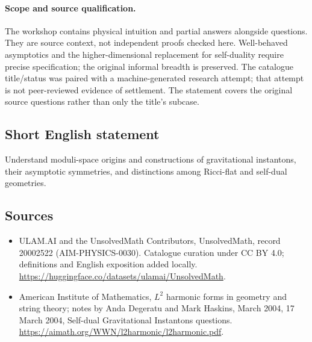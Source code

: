 \documentclass[11pt]{article}
\begin{document}
\paragraph{Scope and source qualification.}The workshop contains physical intuition and partial answers alongside questions. They are source context, not independent proofs checked here. Well-behaved asymptotics and the higher-dimensional replacement for self-duality require precise specification; the original informal breadth is preserved. The catalogue title/status was paired with a machine-generated research attempt; that attempt is not peer-reviewed evidence of settlement. The statement covers the original source questions rather than only the title’s subcase.
\subsection{Short English statement}
Understand moduli-space origins and constructions of gravitational instantons, their asymptotic symmetries, and distinctions among Ricci-flat and self-dual geometries.
\subsection{Sources}
\begin{itemize}
\item[\hypertarget{source:20002522:1}{S1}] ULAM.AI and the UnsolvedMath Contributors, UnsolvedMath, record 20002522 (AIM-PHYSICS-0030). Catalogue curation under CC BY 4.0; definitions and English exposition added locally.
\url{https://huggingface.co/datasets/ulamai/UnsolvedMath}.
\item[\hypertarget{source:20002522:2}{S2}] American Institute of Mathematics, $L^2$ harmonic forms in geometry and string theory; notes by Anda Degeratu and Mark Haskins, March 2004, 17 March 2004, Self-dual Gravitational Instantons questions.
\url{https://aimath.org/WWN/l2harmonic/l2harmonic.pdf}.
\end{itemize}
\label{end:20002522}
\end{document}
